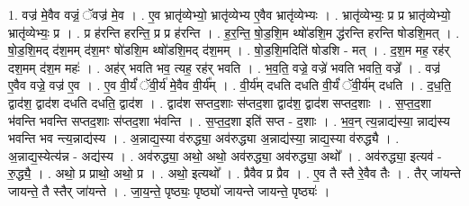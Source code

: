 \documentclass[17pt]{extarticle}
\begin{document}
1. वज्र॑ मे॒वैव वज्रं॒ ॅवज्र॑ मे॒व । . ए॒व भ्रातृ॑व्येभ्यो॒ भ्रातृ॑व्येभ्य ए॒वैव भ्रातृ॑व्येभ्यः । . भ्रातृ॑व्येभ्यः॒ प्र प्र भ्रातृ॑व्येभ्यो॒ भ्रातृ॑व्येभ्यः॒ प्र । . प्र ह॑रन्ति हरन्ति॒ प्र प्र ह॑रन्ति । . ह॒र॒न्ति॒ षो॒ड॒शि॒म थ्षो॑डशि॒म द्ध॑रन्ति हरन्ति षोडशि॒मत् । . षो॒ड॒शि॒मद् द॑श॒मम् द॑श॒मꣳ षो॑डशि॒म थ्षो॑डशि॒मद् द॑श॒मम् । . षो॒ड॒शि॒मदिति॑ षोडशि - मत् । . द॒श॒म मह॒ रह॑र् दश॒मम् द॑श॒म महः॑ । . अह॑र् भवति भव॒ त्यह॒ रह॑र् भवति । . भ॒व॒ति॒ वज्रे॒ वज्रे॑ भवति भवति॒ वज्रे᳚ । . वज्र॑ ए॒वैव वज्रे॒ वज्र॑ ए॒व । . ए॒व वी॒र्यं॑ ॅवी॒र्य॑ मे॒वैव वी॒र्य᳚म् । . वी॒र्य॑म् दधति दधति वी॒र्यं॑ ॅवी॒र्य॑म् दधति । . द॒ध॒ति॒ द्वाद॑श॒ द्वाद॑श दधति दधति॒ द्वाद॑श । . द्वाद॑श सप्तद॒शाः स॑प्तद॒शा द्वाद॑श॒ द्वाद॑श सप्तद॒शाः । . स॒प्त॒द॒शा भ॑वन्ति भवन्ति सप्तद॒शाः स॑प्तद॒शा भ॑वन्ति । . स॒प्त॒द॒शा इति॑ सप्त - द॒शाः । . भ॒व॒न् त्य॒न्नाद्य॑स्या॒ न्नाद्य॑स्य भवन्ति भव न्त्य॒न्नाद्य॑स्य । . अ॒न्नाद्य॒स्या व॑रुद्ध्या॒ अव॑रुद्ध्या अ॒न्नाद्य॑स्या॒ न्नाद्य॒स्या व॑रुद्ध्यै । . अ॒न्नाद्य॒स्येत्य॑न्न - अद्य॑स्य । . अव॑रुद्ध्या॒ अथो॒ अथो॒ अव॑रुद्ध्या॒ अव॑रुद्ध्या॒ अथो᳚ । . अव॑रुद्ध्या॒ इत्यव॑ - रु॒द्ध्यै॒ । . अथो॒ प्र प्राथो॒ अथो॒ प्र । . अथो॒ इत्यथो᳚ । . प्रैवैव प्र प्रैव । . ए॒व तै स्तै रे॒वैव तैः । . तैर् जा॑यन्ते जायन्ते॒ तै स्तैर् जा॑यन्ते । . जा॒य॒न्ते॒ पृष्ठ्यः॒ पृष्ठ्यो॑ जायन्ते जायन्ते॒ पृष्ठ्यः॑ । \newline
\end{document}
